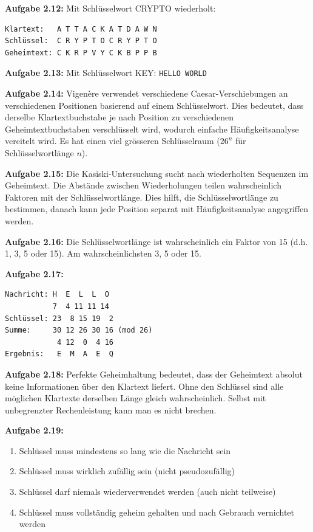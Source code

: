 \documentclass[11pt,a4paper]{report}
\begin{document}
\textbf{Aufgabe 2.12:}
Mit Schlüsselwort CRYPTO wiederholt:
\begin{verbatim}
Klartext:   A T T A C K A T D A W N
Schlüssel:  C R Y P T O C R Y P T O
Geheimtext: C K R P V Y C K B P P B
\end{verbatim}

\textbf{Aufgabe 2.13:}
Mit Schlüsselwort KEY: \texttt{HELLO WORLD}

\textbf{Aufgabe 2.14:}
Vigenère verwendet verschiedene Caesar-Verschiebungen an verschiedenen Positionen basierend auf einem Schlüsselwort. Dies bedeutet, dass derselbe Klartextbuchstabe je nach Position zu verschiedenen Geheimtextbuchstaben verschlüsselt wird, wodurch einfache Häufigkeitsanalyse vereitelt wird. Es hat einen viel grösseren Schlüsselraum ($26^n$ für Schlüsselwortlänge $n$).

\textbf{Aufgabe 2.15:}
Die Kasiski-Untersuchung sucht nach wiederholten Sequenzen im Geheimtext. Die Abstände zwischen Wiederholungen teilen wahrscheinlich Faktoren mit der Schlüsselwortlänge. Dies hilft, die Schlüsselwortlänge zu bestimmen, danach kann jede Position separat mit Häufigkeitsanalyse angegriffen werden.

\textbf{Aufgabe 2.16:}
Die Schlüsselwortlänge ist wahrscheinlich ein Faktor von 15 (d.h. 1, 3, 5 oder 15). Am wahrscheinlichsten 3, 5 oder 15.

\textbf{Aufgabe 2.17:}
\begin{verbatim}
Nachricht: H  E  L  L  O
           7  4 11 11 14
Schlüssel: 23  8 15 19  2
Summe:     30 12 26 30 16 (mod 26)
            4 12  0  4 16
Ergebnis:   E  M  A  E  Q
\end{verbatim}

\textbf{Aufgabe 2.18:}
Perfekte Geheimhaltung bedeutet, dass der Geheimtext absolut keine Informationen über den Klartext liefert. Ohne den Schlüssel sind alle möglichen Klartexte derselben Länge gleich wahrscheinlich. Selbst mit unbegrenzter Rechenleistung kann man es nicht brechen.

\textbf{Aufgabe 2.19:}
\begin{enumerate}
    \item Schlüssel muss mindestens so lang wie die Nachricht sein
    \item Schlüssel muss wirklich zufällig sein (nicht pseudozufällig)
    \item Schlüssel darf niemals wiederverwendet werden (auch nicht teilweise)
    \item Schlüssel muss vollständig geheim gehalten und nach Gebrauch vernichtet werden
\end{enumerate}
\end{document}
